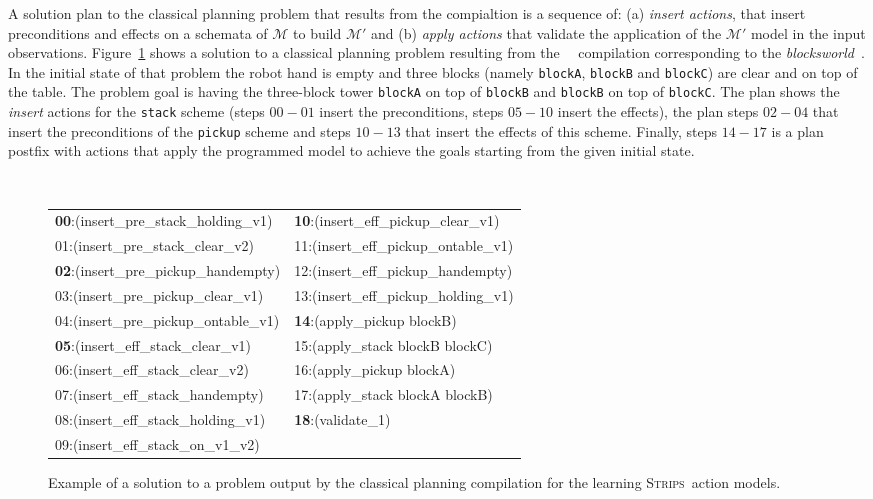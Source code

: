 \documentclass{article}
\newcommand{\strips}{\textsc{Strips}}
\begin{document}
A solution plan to the classical planning problem that results from the compialtion is a sequence of: (a) \emph{insert actions}, that insert preconditions and effects on a schemata of $\mathcal{M}$ to build $\mathcal{M'}$ and (b) \emph{apply actions} that validate the application of the $\mathcal{M'}$ model in the input observations. Figure~\ref{fig:plan-lplan} shows a solution to a classical planning problem resulting from the~\citeauthor{aineto2018learning}~\citeyear{aineto2018learning} compilation corresponding to the {\em blocksworld}~\cite{slaney2001blocks}. In the initial state of that problem the robot hand is empty and three blocks (namely {\small\tt blockA}, {\small\tt blockB} and {\small\tt blockC}) are clear and on top of the table. The problem goal is having the three-block tower {\tt blockA} on top of {\tt blockB} and {\tt blockB} on top of {\tt blockC}. The plan shows the {\em insert} actions for the {\tt\small stack} scheme (steps $00-01$ insert the preconditions, steps $05-10$ insert the effects), the plan steps $02-04$ that  insert the preconditions of the {\tt\small pickup} scheme and steps $10-13$ that insert the effects of this scheme. Finally, steps $14-17$ is a plan postfix with actions that apply the programmed model to achieve the goals starting from the given initial state. 

\begin{figure}[hbt!]
	{\tiny\tt
\begin{tabular}{ll}
		{\bf 00}:(insert\_pre\_stack\_holding\_v1) & {\bf 10}:(insert\_eff\_pickup\_clear\_v1) \\
		01:(insert\_pre\_stack\_clear\_v2) & 11:(insert\_eff\_pickup\_ontable\_v1)\\
                {\bf 02}:(insert\_pre\_pickup\_handempty) & 12:(insert\_eff\_pickup\_handempty)\\
                03:(insert\_pre\_pickup\_clear\_v1) & 13:(insert\_eff\_pickup\_holding\_v1)\\
                04:(insert\_pre\_pickup\_ontable\_v1) & {\bf 14}:(apply\_pickup blockB)\\
                {\bf 05}:(insert\_eff\_stack\_clear\_v1) & 15:(apply\_stack blockB blockC)\\
                06:(insert\_eff\_stack\_clear\_v2) & 16:(apply\_pickup blockA)\\
                07:(insert\_eff\_stack\_handempty) & 17:(apply\_stack blockA blockB) \\
                08:(insert\_eff\_stack\_holding\_v1) &  {\bf 18}:(validate\_1)\\
                09:(insert\_eff\_stack\_on\_v1\_v2) &             		 
\end{tabular}
}
	\caption{\small Example of a solution to a problem output by the classical planning compilation for the learning \strips\ action models.}
	\label{fig:plan-lplan}
\end{figure}
\end{document}

